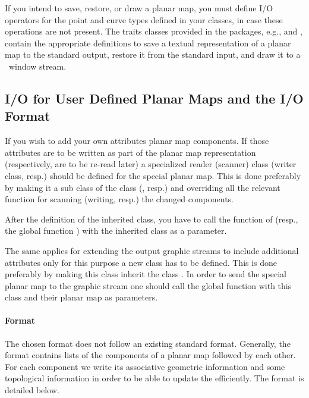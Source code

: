 
If you intend to save, restore, or draw a planar map, you must
define I/O operators for the point and curve types defined in your
 classes, in case these operations are not present. The
traits classes provided in the  packages, e.g.,
 and ,
contain the appropriate definitions to save a textual representation
of a planar map to the standard output, restore it from the standard 
input, and draw it to a \cgal\ window stream.


\begin{ccAdvanced}
\subsection{I/O for User Defined Planar Maps and the I/O Format}

If you wish to add your own attributes planar map components. If
those attributes are to be written as part of the planar map
representation (respectively, are to be re-read later) a specialized
reader (scanner) class (writer class, resp.) should be defined for the
special planar map. This is done preferably by making it a sub class
of the class  (,
resp.) and overriding all the relevant function for scanning (writing,
resp.) the changed components.

After the definition of the inherited class, you have to call the
function  of  (resp., the global
function  ) with the inherited class as a
parameter. 

The same applies for extending the output graphic streams to include
additional attributes only for this purpose a new \/ class
has to be defined.  This is done preferably by making this class
inherit the class . In order to send the special
planar map to the graphic stream one should call the global function
 with this class and their planar map as parameters.

\paragraph{Format}
The chosen format does not follow an existing standard format.
Generally, the format contains lists of the components of a planar map 
followed by each other. For each component we write its associative
geometric information and some topological information in order to be
able to update the  efficiently. The format is detailed
below.


\end{ccAdvanced}
